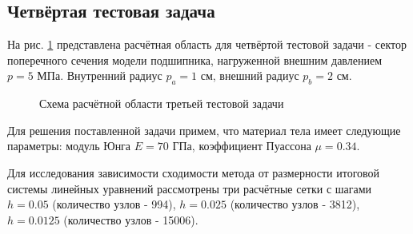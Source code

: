 \documentclass[a4paper]{article}
\begin{document}
\newpage

\subsection{Четвёртая тестовая задача}

На рис. \ref{fig:task_04_scheme} представлена расчётная область для четвёртой тестовой задачи - сектор поперечного сечения модели подшипника, нагруженной внешним давлением $p = 5$ МПа. Внутренний радиус $p_a = 1$ см, внешний радиус $p_b = 2 $ см.

\begin{figure}[h]
\caption{Схема расчётной области третьей тестовой задачи}
\label{fig:task_04_scheme}
\end{figure}

Для решения поставленной задачи примем, что материал тела имеет следующие параметры: модуль Юнга $E = 70$ ГПа, коэффициент Пуассона $\mu = 0.34$. 

Для исследования зависимости сходимости метода от размерности итоговой системы линейных уравнений рассмотрены три расчётные сетки с шагами $h = 0.05$ (количество узлов - 994), $h = 0.025$ (количество узлов - 3812), $h = 0.0125$ (количество узлов - 15006).
\end{document}
